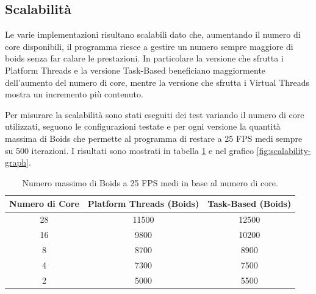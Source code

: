 \documentclass[11pt,notitlepage]{article}
\begin{document}
\subsection{Scalabilità}
Le varie implementazioni risultano scalabili dato che, aumentando il numero di core disponibili, il programma riesce a gestire un numero sempre maggiore di boids senza far calare le prestazioni.
In particolare la versione che sfrutta i Platform Threads e la versione Task-Based beneficiano maggiormente dell'aumento del numero di core, mentre la versione che sfrutta i Virtual Threads mostra un incremento più contenuto.

Per misurare la scalabilità sono stati eseguiti dei test variando il numero di core utilizzati, seguono le configurazioni testate e per ogni versione la quantità massima di Boids che permette al programma di restare a 25 FPS medi
sempre su 500 iterazioni. I risultati sono mostrati in tabella \ref{tab:boids-performance} e nel grafico \ref{fig:scalability-graph}.

\begin{table}[H]
    \centering
    \begin{tabular}{|c|c|c|}
        \hline
        \textbf{Numero di Core} & \textbf{Platform Threads (Boids)} & \textbf{Task-Based (Boids)} \\
        \hline
        28 & 11500 & 12500 \\
        \hline
        16 & 9800 & 10200 \\
        \hline
        8  & 8700 & 8900 \\
        \hline
        4  & 7300 & 7500 \\
        \hline
        2  & 5000 & 5500 \\
        \hline
    \end{tabular}
    \caption{Numero massimo di Boids a 25 FPS medi in base al numero di core.}
    \label{tab:boids-performance}
\end{table}
\end{document}
